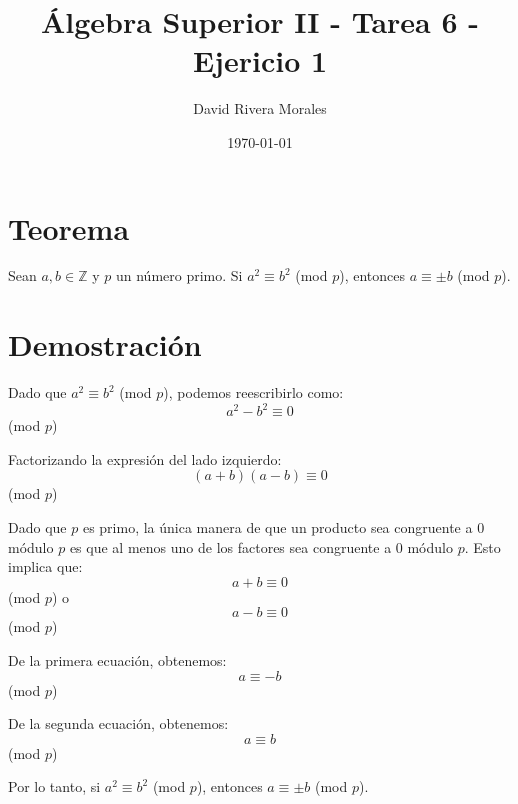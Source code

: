 \documentclass{article}
\begin{document}
\title{Álgebra Superior II - Tarea 6 - Ejericio 1}
\author{David Rivera Morales}
\date{\today} 

\maketitle

\section*{Teorema}
Sean \( a, b \in \mathbb{Z} \) y \( p \) un número primo. Si \( a^2 \equiv b^2 \) (mod \( p \)), entonces \( a \equiv \pm b \) (mod \( p \)).

\section*{Demostración}

Dado que \( a^2 \equiv b^2 \) (mod \( p \)), podemos reescribirlo como:
\[ a^2 - b^2 \equiv 0 \] (mod \( p \))

Factorizando la expresión del lado izquierdo:
\[ (a + b)(a - b) \equiv 0 \] (mod \( p \))

Dado que \( p \) es primo, la única manera de que un producto sea congruente a 0 módulo \( p \) es que al menos uno de los factores sea congruente a 0 módulo \( p \). Esto implica que:
\[ a + b \equiv 0 \] (mod \( p \))
o
\[ a - b \equiv 0 \] (mod \( p \))

De la primera ecuación, obtenemos:
\[ a \equiv -b \] (mod \( p \))

De la segunda ecuación, obtenemos:
\[ a \equiv b \] (mod \( p \))

Por lo tanto, si \( a^2 \equiv b^2 \) (mod \( p \)), entonces \( a \equiv \pm b \) (mod \( p \)).
\end{document}
